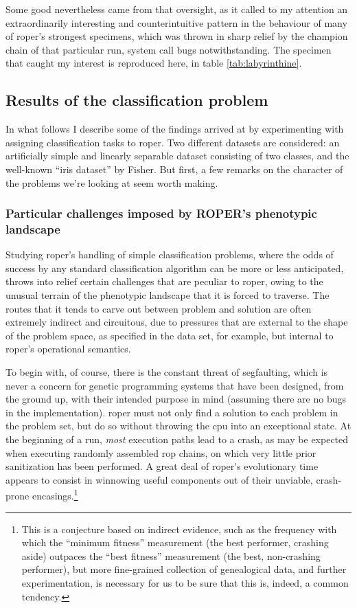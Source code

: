 \documentclass[12pt,glossary]{dalthesis}
\begin{document}
Some good nevertheless came from that oversight, as it called to my attention an
extraordinarily interesting and counterintuitive pattern in the behaviour of
many of \gls{roper}'s strongest specimens, which was thrown in sharp relief by
the champion chain of that particular run, system call bugs notwithstanding.
The specimen that caught my interest is reproduced here, in table
\ref{tab:labyrinthine}.


\subsection{Results of the classification problem}
\label{sec:org3d7e354}
\label{orgcd4cfb6}

In what follows I describe some of the findings arrived at by experimenting
with assigning classification tasks to \gls{roper}. Two different datasets are
considered: an artificially simple and linearly separable dataset consisting
of two classes, and the well-known ``iris dataset'' by Fisher. But first, a few
remarks on the character of the problems we're looking at seem worth making. 


\subsubsection{Particular challenges imposed by ROPER's phenotypic landscape}
\label{sec:org9045dc0}
\label{orgfcedafc}

Studying \gls{roper}'s handling of simple classification problems, where the
odds of success by any standard classification algorithm can be more or less
anticipated, throws into relief certain challenges that are peculiar to \gls{roper},
owing to the unusual terrain of the phenotypic landscape that it is forced to
traverse. The routes that it tends to carve out between problem and solution
are often extremely indirect and circuitous, due to pressures that are external
to the shape of the problem space, as specified in the data set, for example, but
internal to \gls{roper}'s operational semantics.

To begin with, of course, there is the constant threat of segfaulting, which is
never a concern for genetic programming systems that have been designed, from the
ground up, with their intended purpose in mind (assuming there are no bugs in the
implementation). \Gls{roper} must not only find a solution to each problem in the
problem set, but do so without throwing the \gls{cpu} into an exceptional state. At
the beginning of a run, \emph{most} execution paths lead to a crash, as may be expected
when executing randomly assembled \gls{rop} chains, on which very little prior
sanitization has been performed. A great deal of \gls{roper's} evolutionary time
appears to consist in winnowing useful components out of their unviable, crash-prone
encasings.\footnote{This is a conjecture based on indirect evidence, such as the frequency with which
  the ``minimum fitness'' measurement (the best performer, crashing aside) outpaces
  the ``best fitness'' measurement (the best, non-crashing performer), but more
  fine-grained collection of genealogical data, and further experimentation, is
  necessary for us to be sure that this is, indeed, a common tendency.} 
\end{document}
